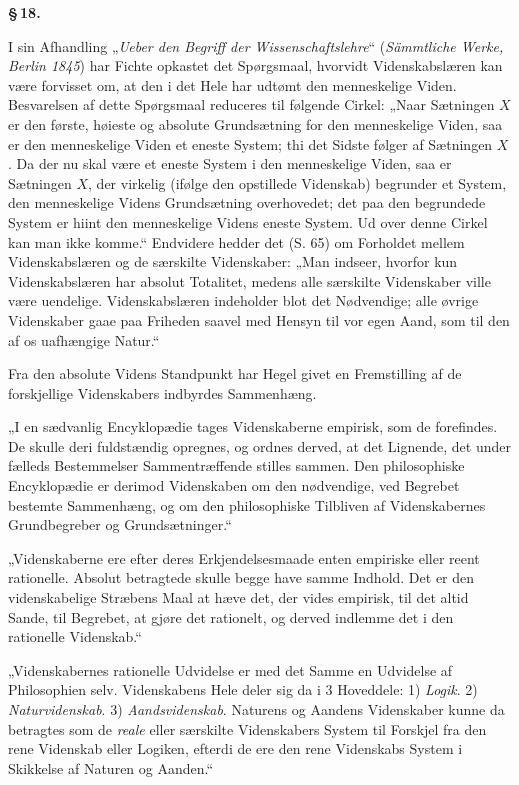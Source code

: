 \documentclass[12pt]{book}
\newcommand{\opage}[1]{\marginnote{\footnotesize\textit{[#1]}}}
\begin{document}
\begin{center}{\bfseries \S\,18.}\end{center}

I sin Afhandling „\textit{Ueber den Begriff der Wissenschaftslehre}“ (\textit{Sämmtliche
Werke, Berlin 1845}) har Fichte opkastet det Spørgsmaal, hvorvidt Videnskabslæren kan
være forvisset om, at den i det Hele har udtømt den menneskelige Viden. Besvarelsen af
dette Spørgsmaal reduceres til følgende Cirkel: „Naar Sætningen $X$ er den første,
høieste og absolute Grundsætning for den menneskelige Viden, saa er den menneskelige
Viden et eneste System; thi det Sidste følger af Sætningen $X$. Da der nu skal være et
eneste System i den menneskelige Viden, saa er Sætningen $X$, der virkelig (ifølge den
opstillede Videnskab) begrunder et System, den menneskelige Videns Grundsætning
overhovedet; det paa den begrundede System er hiint den menneskelige Videns eneste
System. Ud over denne Cirkel kan man ikke komme.“ Endvidere hedder det (S. 65) om
Forholdet mellem Videnskabslæren og de særskilte Videnskaber: „Man indseer, hvorfor kun
Videnskabslæren har absolut Totalitet, medens alle særskilte Videnskaber ville være
uendelige.
\opage{84} Videnskabslæren indeholder blot det Nødvendige; alle øvrige Videnskaber gaae paa
Friheden saavel med Hensyn til vor egen Aand, som til den af os uafhængige Natur.“

Fra den absolute Videns Standpunkt har Hegel givet en Fremstilling af de forskjellige
Videnskabers indbyrdes Sammenhæng.

„I en sædvanlig Encyklopædie tages Videnskaberne empirisk, som de forefindes. De skulle
deri fuldstændig opregnes, og ordnes derved, at det Lignende, det under fælleds
Bestemmelser Sammentræffende stilles sammen. Den philosophiske Encyklopædie er derimod
Videnskaben om den nødvendige, ved Begrebet bestemte Sammenhæng, og om den philosophiske
Tilbliven af Videnskabernes Grundbegreber og Grundsætninger.“

„Videnskaberne ere efter deres Erkjendelsesmaade enten empiriske eller reent rationelle.
Absolut betragtede skulle begge have samme Indhold. Det er den videnskabelige Stræbens
Maal at hæve det, der vides empirisk, til det altid Sande, til Begrebet, at gjøre det
rationelt, og derved indlemme det i den rationelle Videnskab.“

„Videnskabernes rationelle Udvidelse er med det Samme en Udvidelse af Philosophien selv.
Videnskabens Hele deler sig da i 3 Hoveddele: 1) \emph{Logik}. 2) \emph{Naturvidenskab}.
3) \emph{Aandsvidenskab}. Naturens og Aandens Videnskaber kunne da betragtes som de
\emph{reale} eller særskilte Videnskabers System til Forskjel fra den rene Videnskab
eller Logiken, efterdi de ere den rene Videnskabs System i Skikkelse af Naturen og
Aanden.“
\end{document}
